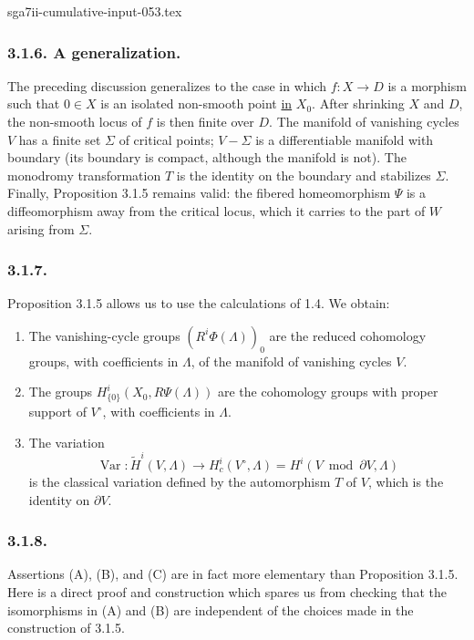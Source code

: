 \begin{filecontents*}{sga7ii-cumulative-input-053.tex}
\subsubsection*{3.1.6. A generalization.}
The preceding discussion generalizes to the case in which
$f:X\to D$ is a morphism such that $0\in X$ is an isolated
non-smooth point \underline{in} $X_0$.  After shrinking $X$ and $D$,
the non-smooth locus of $f$ is then finite over $D$.  The manifold of
vanishing cycles $V$ has a finite set $\Sigma$ of critical points;
$V-\Sigma$ is a differentiable manifold with boundary (its boundary
is compact, although the manifold is not).  The monodromy
transformation $T$ is the identity on the boundary and stabilizes
$\Sigma$.  Finally, Proposition 3.1.5 remains valid: the fibered
homeomorphism $\Psi$ is a diffeomorphism away from the critical locus,
which it carries to the part of $W$ arising from $\Sigma$.

\subsubsection*{3.1.7.}
Proposition 3.1.5 allows us to use the calculations of 1.4.  We obtain:

\begin{enumerate}[label=(\Alph*)]
\item The vanishing-cycle groups $(R^i\Phi(\Lambda))_0$ are the
  reduced cohomology groups, with coefficients in $\Lambda$, of the
  manifold of vanishing cycles $V$.
\item The groups
  $H^i_{\{0\}}(X_0,R\Psi(\Lambda))$ are the cohomology groups with
  proper support of $V^\circ$, with coefficients in $\Lambda$.
\item The variation
  \[
  \operatorname{Var}:\widetilde H^i(V,\Lambda)
  \longrightarrow H_c^i(V^\circ,\Lambda)
  =H^i(V\bmod\partial V,\Lambda)
  \]
  is the classical variation defined by the automorphism $T$ of $V$,
  which is the identity on $\partial V$.
\end{enumerate}

\subsubsection*{3.1.8.}
Assertions (A), (B), and (C) are in fact more elementary than
Proposition 3.1.5.  Here is a direct proof and construction which
spares us from checking that the isomorphisms in (A) and (B) are
independent of the choices made in the construction of 3.1.5.


\end{filecontents*}

